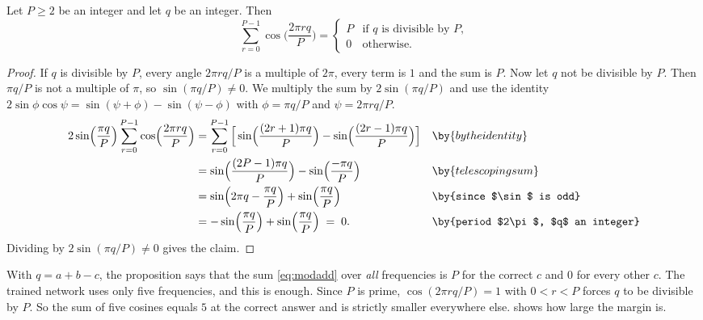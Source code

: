 \begin{proposition}\label{prop:cos}
Let $P\ge2$ be an integer and let $q$ be an integer. Then
\[
\sum_{r=0}^{P-1}\cos\!\Big(\frac{2\pi rq}{P}\Big)=\begin{cases}P&\text{if $q$ is divisible by $P$,}\\ 0&\text{otherwise.}\end{cases}
\]
\end{proposition}
\begin{proof}
If $q$ is divisible by $P$, every angle $2\pi rq/P$ is a multiple of $2\pi$, every term is $1$ and the sum is
$P$. Now let $q$ not be divisible by $P$. Then $\pi q/P$ is not a multiple of $\pi$, so $\sin(\pi q/P)\ne0$.
We multiply the sum by $2\sin(\pi q/P)$ and use the identity $2\sin\phi\cos\psi=\sin(\psi+\phi)-\sin(\psi-\phi)$
with $\phi=\pi q/P$ and $\psi=2\pi rq/P$.
\begin{align*}
2\sin\!\Big(\frac{\pi q}{P}\Big)\sum_{r=0}^{P-1}\cos\!\Big(\frac{2\pi rq}{P}\Big)
&= \sum_{r=0}^{P-1}\Big[\sin\!\Big(\frac{(2r+1)\pi q}{P}\Big)-\sin\!\Big(\frac{(2r-1)\pi q}{P}\Big)\Big] && \by{by the identity}\\
&= \sin\!\Big(\frac{(2P-1)\pi q}{P}\Big)-\sin\!\Big(\frac{-\pi q}{P}\Big) && \by{telescoping sum}\\
&= \sin\!\Big(2\pi q-\frac{\pi q}{P}\Big)+\sin\!\Big(\frac{\pi q}{P}\Big) && \by{since $\sin$ is odd}\\
&= -\sin\!\Big(\frac{\pi q}{P}\Big)+\sin\!\Big(\frac{\pi q}{P}\Big) \;=\; 0. && \by{period $2\pi$, $q$ an integer}
\end{align*}
Dividing by $2\sin(\pi q/P)\ne0$ gives the claim.
\end{proof}

With $q=a+b-c$, the proposition says that the sum \eqref{eq:modadd} over \emph{all} frequencies is $P$ for the
correct $c$ and $0$ for every other $c$. The trained network uses only five frequencies, and this is enough.
Since $P$ is prime, $\cos(2\pi rq/P)=1$ with $0<r<P$ forces $q$ to be divisible by $P$. So the sum of five
cosines equals $5$ at the correct answer and is strictly smaller everywhere else.  shows how
large the margin is.


